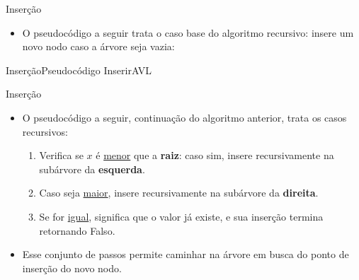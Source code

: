 \documentclass[aspectratio=169]{beamer}
\newcommand{\rememberlines}{\xdef\rememberedlines{\number\value{AlgoLine}}}
\begin{document}

\begin{frame}{Inserção}
\begin{itemize}
 \item O pseudocódigo a seguir trata o caso base do algoritmo recursivo: insere um novo nodo caso a árvore seja vazia:
\end{itemize}
\end{frame}


\begin{frame}{Inserção}{Pseudocódigo InserirAVL}
\begin{algorithm}[H]
\caption{InserirAVL} 
\label{InserirAVL}
\rememberlines
\end{algorithm}
\end{frame}


\begin{frame}{Inserção}
\begin{itemize}
 \item O pseudocódigo a seguir, continuação do algoritmo anterior, trata os casos recursivos:
 \begin{enumerate}
  \item Verifica se $x$ é \underline{menor} que a {\bf raiz}: caso sim, insere recursivamente na subárvore da {\bf esquerda}.
  \item Caso seja \underline{maior}, insere recursivamente na subárvore da {\bf direita}.
  \item Se for \underline{igual}, significa que o valor já existe, e sua inserção termina retornando Falso.
 \end{enumerate}
 \item Esse conjunto de passos permite caminhar na árvore em busca do ponto de inserção do novo nodo. 
\end{itemize}
\end{frame}
\end{document}
